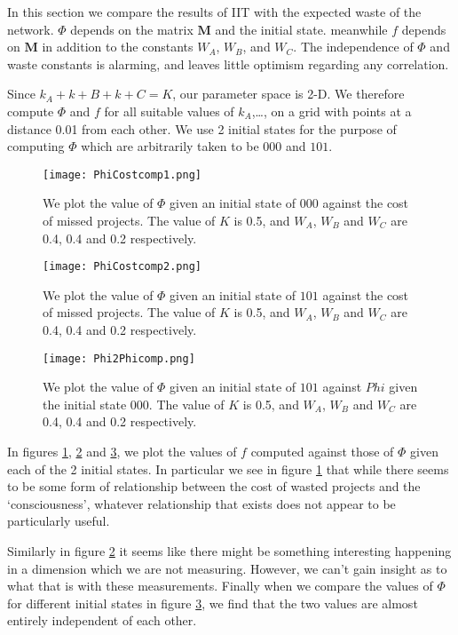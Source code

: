 In this section we compare the results of IIT with the expected waste of the network. $\Phi$ depends on the matrix $\mathbf{M}$ and the initial state. meanwhile $f$ depends on $\mathbf{M}$ in addition to the constants $W_A$, $W_B$, and $W_C$. The independence of $\Phi$ and waste constants is alarming, and leaves little optimism regarding any correlation. 

Since $k_A + k+B+ k+C = K$, our parameter space is 2-D. We therefore compute $\Phi$ and $f$ for all suitable values of $k_A$,\ldots, on a grid with points at a distance 0.01 from each other. We use 2 initial states for the purpose of computing $\Phi$ which are arbitrarily taken to be $000$ and $101$.

\begin{figure}[h!]
	\centering
	\texttt{[image: PhiCostcomp1.png]}
	\caption{We plot the value of $\Phi$ given an initial state of $000$  against the cost of missed projects. The value of $K$ is 0.5, and $W_A$, $W_B$ and $W_C$ are 0.4, 0.4 and 0.2 respectively. }
	\label{fig:PhiCostcomp1}
\end{figure}

\begin{figure}[h!]
	\centering
	\texttt{[image: PhiCostcomp2.png]}
	\caption{We plot the value of $\Phi$ given an initial state of $101$ against the cost of missed projects. The value of $K$ is 0.5, and $W_A$, $W_B$ and $W_C$ are 0.4, 0.4 and 0.2 respectively. }
	\label{fig:PhiCostcomp2}
\end{figure}

\begin{figure}[h!]
	\centering
	\texttt{[image: Phi2Phicomp.png]}
	\caption{We plot the value of $\Phi$ given an initial state of $101$ against $Phi$ given the initial state $000$. The value of $K$ is 0.5, and $W_A$, $W_B$ and $W_C$ are 0.4, 0.4 and 0.2 respectively. }
	\label{fig:Ph2Phicomp}
\end{figure}

In figures \ref{fig:PhiCostcomp1}, \ref{fig:PhiCostcomp2} and \ref{fig:Ph2Phicomp}, we plot the values of $f$ computed against those of $\Phi$ given each of the 2 initial states. In particular we see in figure \ref{fig:PhiCostcomp1} that while there seems to be some form of relationship between the cost of wasted projects and the `consciousness', whatever relationship that exists does not appear to be particularly useful. 

Similarly in figure \ref{fig:PhiCostcomp2} it seems like there might be something interesting happening in a dimension which we are not measuring. However, we can't gain insight as to what that is with these measurements. Finally when we compare the values of $\Phi$ for different initial states in figure \ref{fig:Ph2Phicomp}, we find that the two values are almost entirely independent of each other. 


